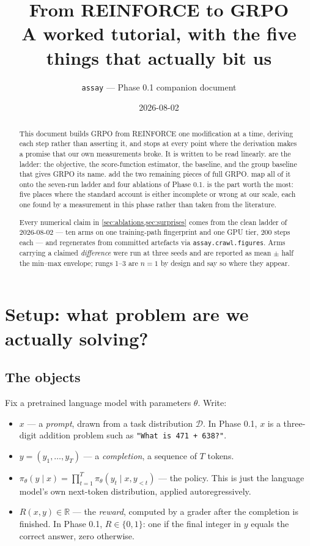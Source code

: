 \documentclass[11pt,letterpaper]{article}
\title{\textbf{From REINFORCE to GRPO\\[4pt]
\large A worked tutorial, with the five things that actually bit us}}
\author{\texttt{assay} --- Phase 0.1 companion document}
\date{2026-08-02}
\theoremstyle{definition}
\newcommand{\R}{\mathbb{R}}
\newcommand{\pol}{\pi_\theta}
\begin{document}
\maketitle

\begin{abstract}\noindent
This document builds GRPO from REINFORCE one modification at a time, deriving each step rather than
asserting it, and stops at every point where the derivation makes a promise that our own measurements
broke. It is written to be read linearly.  are
the ladder: the objective, the score-function estimator, the baseline, and the group baseline that
gives GRPO its name.  add the two remaining pieces of full GRPO.
 map all of it onto the seven-run ladder and four ablations of Phase
0.1.  is the part worth the most: five places where the standard account is
either incomplete or wrong at our scale, each one found by a measurement in this phase rather than
taken from the literature.

Every numerical claim in \cref{sec:ablations,sec:surprises} comes from the clean ladder of
2026-08-02 --- ten arms on one training-path fingerprint and one GPU tier, 200 steps each --- and
regenerates from committed artefacts via \texttt{assay.crawl.figures}. Arms carrying a claimed
\emph{difference} were run at three seeds and are reported as mean $\pm$ half the min--max envelope;
rungs 1--3 are $n=1$ by design and say so where they appear.
\end{abstract}

\tableofcontents

\section{Setup: what problem are we actually solving?}
\label{sec:setup}

\subsection{The objects}

Fix a pretrained language model with parameters $\theta$. Write:

\begin{itemize}
  \item $x$ --- a \emph{prompt}, drawn from a task distribution $\mathcal{D}$. In Phase 0.1, $x$ is a
        three-digit addition problem such as \texttt{"What is 471 + 638?"}.
  \item $y = (y_1, \dots, y_T)$ --- a \emph{completion}, a sequence of $T$ tokens.
  \item $\pol(y \mid x) = \prod_{t=1}^{T} \pol(y_t \mid x, y_{<t})$ --- the policy. This is just the
        language model's own next-token distribution, applied autoregressively.
  \item $R(x, y) \in \R$ --- the \emph{reward}, computed by a grader after the completion is
        finished. In Phase 0.1, $R \in \{0, 1\}$: one if the final integer in $y$ equals the correct
        answer, zero otherwise.
\end{itemize}
\end{document}
